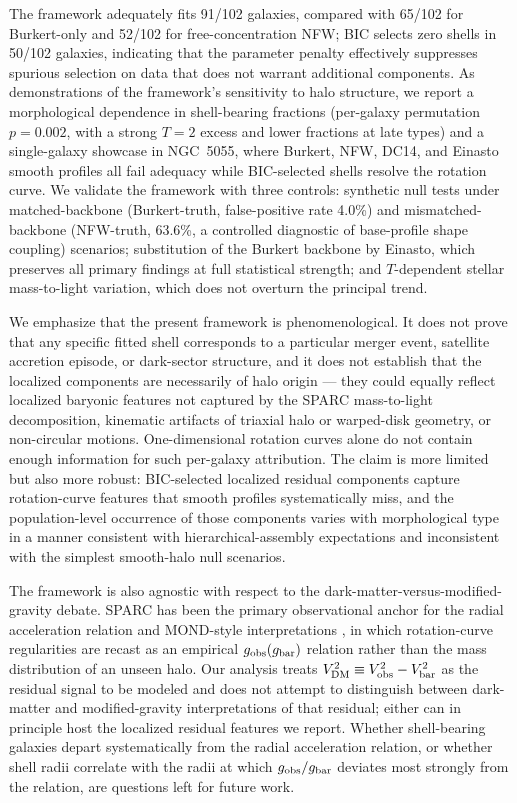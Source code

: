 \documentclass[linenumbers]{aastex701}
\begin{document}
The framework adequately fits 91/102 galaxies, compared with 65/102 for Burkert-only and 52/102 for free-concentration NFW; BIC selects zero shells in 50/102 galaxies, indicating that the parameter penalty effectively suppresses spurious selection on data that does not warrant additional components. As demonstrations of the framework's sensitivity to halo structure, we report a morphological dependence in shell-bearing fractions (per-galaxy permutation $p = 0.002$, with a strong $T=2$ excess and lower fractions at late types) and a single-galaxy showcase in NGC~5055, where Burkert, NFW, DC14, and Einasto smooth profiles all fail adequacy while BIC-selected shells resolve the rotation curve. We validate the framework with three controls: synthetic null tests under matched-backbone (Burkert-truth, false-positive rate 4.0\%) and mismatched-backbone (NFW-truth, 63.6\%, a controlled diagnostic of base-profile shape coupling) scenarios; substitution of the Burkert backbone by Einasto, which preserves all primary findings at full statistical strength; and $T$-dependent stellar mass-to-light variation, which does not overturn the principal trend.

We emphasize that the present framework is phenomenological. It does not prove that any specific fitted shell corresponds to a particular merger event, satellite accretion episode, or dark-sector structure, and it does not establish that the localized components are necessarily of halo origin --- they could equally reflect localized baryonic features not captured by the SPARC mass-to-light decomposition, kinematic artifacts of triaxial halo or warped-disk geometry, or non-circular motions. One-dimensional rotation curves alone do not contain enough information for such per-galaxy attribution. The claim is more limited but also more robust: BIC-selected localized residual components capture rotation-curve features that smooth profiles systematically miss, and the population-level occurrence of those components varies with morphological type in a manner consistent with hierarchical-assembly expectations and inconsistent with the simplest smooth-halo null scenarios.

The framework is also agnostic with respect to the dark-matter-versus-modified-gravity debate. SPARC has been the primary observational anchor for the radial acceleration relation and MOND-style interpretations \citep[][for a review of MOND in the rotation-curve context, see \citealt{Famaey2012}]{McGaugh2016}, in which rotation-curve regularities are recast as an empirical $g_{\rm obs}(g_{\rm bar})$ relation rather than the mass distribution of an unseen halo. Our analysis treats $V_{\rm DM}^2 \equiv V_{\rm obs}^2 - V_{\rm bar}^2$ as the residual signal to be modeled and does not attempt to distinguish between dark-matter and modified-gravity interpretations of that residual; either can in principle host the localized residual features we report. Whether shell-bearing galaxies depart systematically from the radial acceleration relation, or whether shell radii correlate with the radii at which $g_{\rm obs}/g_{\rm bar}$ deviates most strongly from the relation, are questions left for future work.
\end{document}
